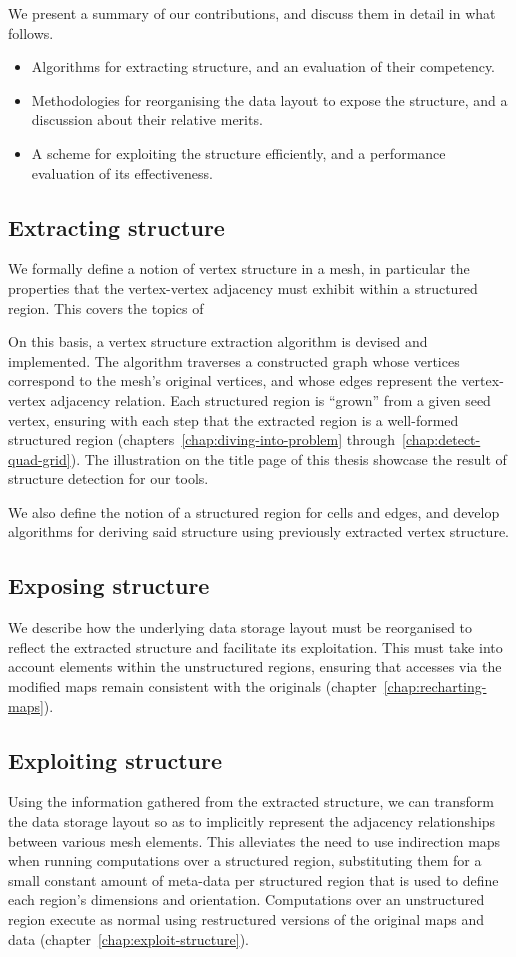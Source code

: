 We present a summary of our contributions, and discuss them in detail in what follows.

\begin{itemize}
\item Algorithms for extracting structure, and an evaluation of their competency.
\item Methodologies for reorganising the data layout to expose the structure, and a discussion about their relative merits.
\item A scheme for exploiting the structure efficiently, and a performance evaluation of its effectiveness.
\end{itemize}


\subsection{Extracting structure}
We formally define a notion of vertex structure in a mesh, in particular the properties that the vertex-vertex adjacency must exhibit within a structured region. This covers the topics of


On this basis, a vertex structure extraction algorithm is devised and implemented. The algorithm traverses a constructed graph whose vertices correspond to the mesh's original vertices, and whose edges represent the vertex-vertex adjacency relation. Each structured region is ``grown'' from a given seed vertex, ensuring with each step that the extracted region is a well-formed structured region (chapters~\ref{chap:diving-into-problem} through~\ref{chap:detect-quad-grid}). The illustration on the title page of this thesis showcase the result of structure detection for our tools.

We also define the notion of a structured region for cells and edges, and develop algorithms for deriving said structure using previously extracted vertex structure.

\subsection{Exposing structure}
We describe how the underlying data storage layout must be reorganised to reflect the extracted structure and facilitate its exploitation. This must take into account elements within the unstructured regions, ensuring that accesses via the modified maps remain consistent with the originals (chapter~\ref{chap:recharting-maps}).

\subsection{Exploiting structure}
Using the information gathered from the extracted structure, we can transform the data storage layout so as to implicitly represent the adjacency relationships between various mesh elements. This alleviates the need to use indirection maps when running computations over a structured region, substituting them for a small constant amount of meta-data per structured region that is used to define each region's dimensions and orientation. Computations over an unstructured region execute as normal using restructured versions of the original maps and data (chapter~\ref{chap:exploit-structure}).

